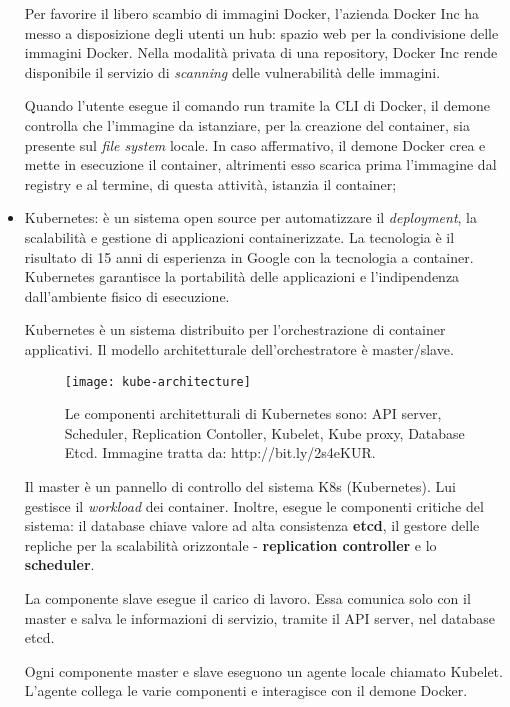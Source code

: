 \begin{itemize}
	Per favorire il libero scambio di immagini Docker, l'azienda Docker Inc ha 
	messo a disposizione degli utenti un hub: spazio web per la condivisione delle immagini Docker. Nella modalità privata di una repository, Docker Inc rende disponibile 
	il servizio di \textit{scanning} delle vulnerabilità delle immagini. 
	
	Quando l'utente esegue il comando run tramite la CLI di Docker, il demone controlla che l'immagine da istanziare, per la creazione del container, sia presente sul \textit{file system} locale. In caso affermativo, il demone Docker crea e mette in esecuzione il container, altrimenti esso scarica prima l'immagine dal registry e al termine, di questa attività, istanzia il container;
	\item Kubernetes: è un sistema open source per automatizzare il \textit{deployment}, la scalabilità e gestione di applicazioni containerizzate. La tecnologia è il 
	risultato di 15 anni di esperienza in Google con la tecnologia a container. 
	Kubernetes garantisce la portabilità delle applicazioni e l'indipendenza dall'ambiente fisico di esecuzione.
	
	Kubernetes è un sistema distribuito per l'orchestrazione di container applicativi. Il modello architetturale dell'orchestratore è master/slave.
	
	\begin{figure}[htbp]
		\begin{center}
			\texttt{[image: kube-architecture]}
			\caption{Le componenti architetturali di Kubernetes sono: API server, Scheduler, Replication Contoller, Kubelet, Kube proxy, Database Etcd. Immagine tratta da: http://bit.ly/2s4eKUR.}
		\end{center}
	\end{figure}
	
	Il master è un pannello di controllo del sistema K8s (Kubernetes). Lui gestisce il \textit{workload} dei container. Inoltre, esegue le componenti critiche del sistema: il database chiave valore ad alta consistenza \textbf{etcd}, il gestore delle repliche per la scalabilità orizzontale - \textbf{replication controller} e lo \textbf{scheduler}.  
	
	La componente slave esegue il carico di lavoro. Essa comunica solo con il master e salva le informazioni di servizio, tramite il API server, nel database etcd. 
	
	Ogni componente master e slave eseguono un agente locale chiamato Kubelet. L'agente collega le varie componenti e interagisce con il demone Docker. 
	

\end{itemize}
